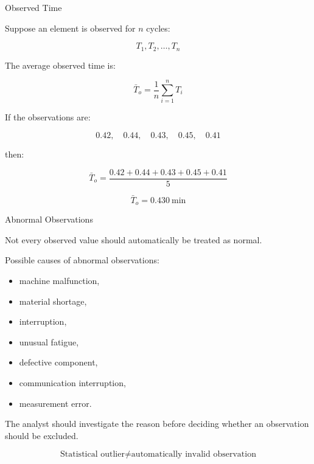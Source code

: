 \documentclass[aspectratio=169,10pt]{beamer}
\begin{document}
\begin{frame}[shrink=18]{Observed Time}
\small

Suppose an element is observed for \(n\) cycles:

\[
T_1,T_2,\ldots,T_n
\]

The average observed time is:

\[
\boxed{
\bar T_o
=
\frac{1}{n}
\sum_{i=1}^{n}T_i
}
\]

If the observations are:

\[
0.42,\quad0.44,\quad0.43,\quad0.45,\quad0.41
\]

then:

\[
\bar T_o
=
\frac{0.42+0.44+0.43+0.45+0.41}{5}
\]

\[
\boxed{
\bar T_o=0.430\ \text{min}
}
\]

\end{frame}


\begin{frame}[shrink=18]{Abnormal Observations}
\small

Not every observed value should automatically be treated as normal.

Possible causes of abnormal observations:

\begin{itemize}
    \item machine malfunction,
    \item material shortage,
    \item interruption,
    \item unusual fatigue,
    \item defective component,
    \item communication interruption,
    \item measurement error.
\end{itemize}

\vspace{5pt}

The analyst should investigate the reason before deciding whether
an observation should be excluded.

\[
\boxed{
\text{Statistical outlier} \neq \text{automatically invalid observation}
}
\]

\end{frame}

\end{document}
